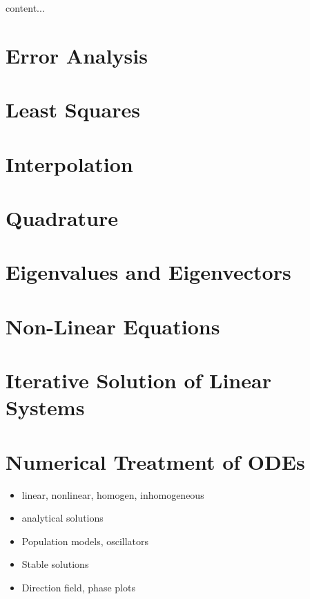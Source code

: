 \begin{definition}
	content...
\end{definition}

\pagebreak

\section{Error Analysis}

\pagebreak


\section{Least Squares}

\pagebreak


\section{Interpolation}


\section{Quadrature}

\section{Eigenvalues and Eigenvectors}


\section{Non-Linear Equations}


\section{Iterative Solution of Linear Systems}

\section{Numerical Treatment of ODEs}
\begin{itemize}
	\item linear, nonlinear, homogen, inhomogeneous
	\item analytical solutions
	\item Population models, oscillators
	\item Stable solutions
	\item Direction field, phase plots
\end{itemize}


